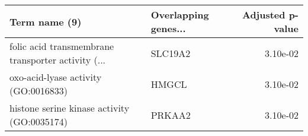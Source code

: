\begin{tabular}{llr}
\toprule
                                     Term name (9) & Overlapping genes... &  Adjusted p-value \\
\midrule
folic acid transmembrane transporter activity (... &              SLC19A2 &          3.10e-02 \\
              oxo-acid-lyase activity (GO:0016833) &                HMGCL &          3.10e-02 \\
       histone serine kinase activity (GO:0035174) &               PRKAA2 &          3.10e-02 \\
\bottomrule
\end{tabular}
